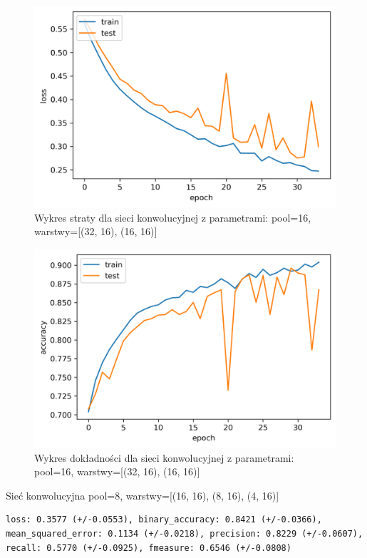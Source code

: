 \documentclass[polish,12pt]{aghthesis}
\begin{document}
\begin{figure}[H]
	\centering
	\captionsetup{justification=centering}
	\includegraphics[width=0.7\linewidth]{conv_16_32_loss.png}
	\caption{Wykres straty dla sieci konwolucyjnej z parametrami: pool=16, warstwy=[(32, 16), (16, 16)]}
	\label{fig:conv_16_32_loss}
\end{figure}
\begin{figure}[H]
	\centering
	\captionsetup{justification=centering}
	\includegraphics[width=0.7\linewidth]{conv_16_32_acc.png}
	\caption{Wykres dokładności dla sieci konwolucyjnej z parametrami: pool=16, warstwy=[(32, 16), (16, 16)]}
	\label{fig:conv_16_32_acc}
\end{figure}

Sieć konwolucyjna pool=8, warstwy=[(16, 16), (8, 16), (4, 16)]

\begin{lstlisting}[float=h!, style=result, caption={Wyniki sieci konwolucyjnej}]
loss: 0.3577 (+/-0.0553), binary_accuracy: 0.8421 (+/-0.0366), mean_squared_error: 0.1134 (+/-0.0218), precision: 0.8229 (+/-0.0607), recall: 0.5770 (+/-0.0925), fmeasure: 0.6546 (+/-0.0808)
\end{lstlisting}
\end{document}
